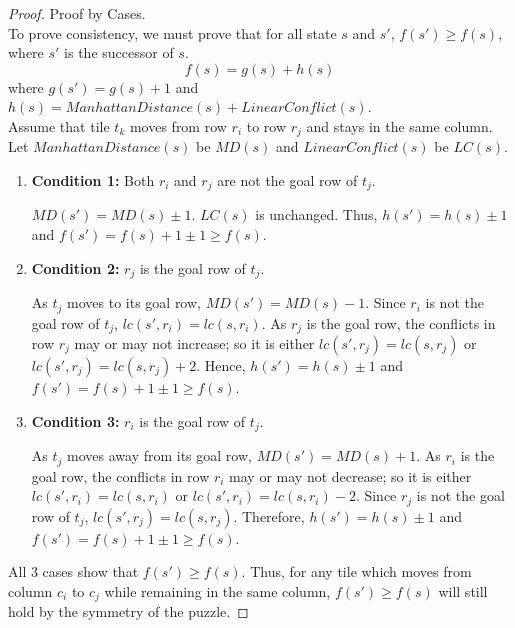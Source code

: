 \documentclass[runningheads]{llncs}
\begin{document}
\begin{proof} Proof by Cases. \\
    To prove consistency, we must prove that for all state \( s \) and \( s' \), \( f(s') \geq f(s) \), where \( s' \) is the successor of \( s \).
\[
    f(s) = g(s) + h(s)
\]
where $g(s') = g(s) + 1$ and $h(s) = ManhattanDistance(s) + LinearConflict(s)$. \\
Assume that tile \( t_k \) moves from row \( r_i \) to row \( r_j \) and stays in the same column. Let \( ManhattanDistance(s) \) be \( MD(s) \) and \( LinearConflict(s) \) be \( LC(s) \). 
\begin{enumerate}
    \item \textbf{Condition 1:} Both \( r_i \) and \( r_j \) are not the goal row of \( t_j \).
    
        \( MD(s') = MD(s) \pm 1 \). \( LC(s) \) is unchanged. Thus, \( h(s') = h(s) \pm 1 \) and \( f(s') = f(s) + 1 \pm 1 \geq f(s) \).
    
    \item \textbf{Condition 2:} \( r_j \) is the goal row of \( t_j \).
        
        As \( t_j \) moves to its goal row, \( MD(s') = MD(s) - 1 \). Since \( r_i \) is not the goal row of \( t_j \), \( lc(s', r_i) = lc(s, r_i) \). 
        As \( r_j \) is the goal row, the conflicts in row \( r_j \) may or may not increase; so it is either \( lc(s', r_j) = lc(s, r_j) \) or \( lc(s', r_j) = lc(s, r_j) + 2 \). 
        Hence, \( h(s') = h(s) \pm 1 \) and \( f(s') = f(s) + 1 \pm 1 \geq f(s) \).

    \item \textbf{Condition 3:} \( r_i \) is the goal row of \( t_j \).
    
        As \( t_j \) moves away from its goal row, \( MD(s') = MD(s) + 1 \). 
        As \( r_i \) is the goal row, the conflicts in row \( r_i \) may or may not decrease; so it is either \( lc(s', r_i) = lc(s, r_i) \) or \( lc(s', r_i) = lc(s, r_i) - 2 \). 
        Since \( r_j \) is not the goal row of \( t_j \), \( lc(s', r_j) = lc(s, r_j) \). 
        Therefore, \( h(s') = h(s) \pm 1 \) and \( f(s') = f(s) + 1 \pm 1 \geq f(s) \).
\end{enumerate}
All 3 cases show that \( f(s') \geq f(s) \). Thus, for any tile which moves from column \( c_i \) to \( c_j \) while remaining in the same column, \( f(s') \geq f(s) \) will still hold by the symmetry of the puzzle.
\end{proof}
\end{document}
